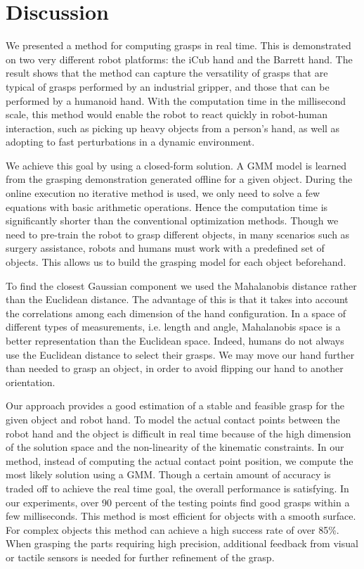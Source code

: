 \section{Discussion}
\label{cha3:sec6}

We presented a method for computing grasps in real time. This is demonstrated on two very different robot platforms: the iCub hand and the Barrett hand. The result shows that the method can capture the versatility of grasps that are typical of grasps performed by an industrial gripper, and those that can be performed by a humanoid hand.
With the computation time in the millisecond scale,
this method would enable the robot to react quickly in robot-human interaction, such as picking up heavy objects from a person's hand, as well as adopting to fast perturbations in a dynamic environment.

We achieve this goal by using a closed-form solution. A GMM model is learned from the grasping demonstration generated offline for a given object. During the online execution no iterative method is used, we only need to solve a few equations with basic arithmetic operations. Hence the computation time is significantly shorter than the conventional optimization methods. Though we need to pre-train the robot to grasp different objects, in many scenarios such as surgery assistance, robots and humans must work with a predefined set of objects. This allows us to build the grasping model for each object beforehand.


To find the closest Gaussian component we used the Mahalanobis distance rather than the Euclidean distance. The advantage of this is that it takes into account the correlations among each dimension of the hand configuration. In a space of different types of measurements, i.e. length and angle, Mahalanobis space is a better representation than the Euclidean space. Indeed, humans do not always use the Euclidean distance to select their grasps. We may move our hand further than needed to grasp an object, in order to avoid flipping our hand to another orientation.

Our approach provides a good estimation of a stable and feasible grasp for the given object and robot hand. To model the actual contact points between the robot hand and the object is difficult in real time because of the high dimension of the solution space and the non-linearity of the kinematic constraints. In our method, instead of computing the actual contact point position, we compute the most likely solution using a GMM. Though a certain amount of accuracy is traded off to achieve the real time goal, the overall performance is satisfying. In our experiments, over 90 percent of the testing points find good grasps within a few milliseconds. This method is most efficient for objects with a smooth surface. For complex objects this method can achieve a high success rate of over 85\%. When grasping the parts requiring high precision, additional feedback from visual or tactile sensors is needed for further refinement of the grasp.

